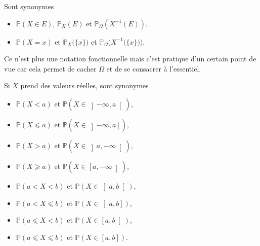 %
\begin{terminology}
Sont synonymes
\begin{itemize}
\item
\(ℙ(𝑋∈𝐸)\), \(ℙ_{𝑋}(𝐸)\) et \(ℙ_Ω(𝑋^{-1}(𝐸))\).
\item
\(ℙ(𝑋=𝑥)\) et  \(ℙ_{𝑋}\bigl(\{𝑥\}\bigr)\) et \(ℙ_Ω\bigl(𝑋^{-1}\bigl(\{𝑥\}\bigr)\bigr)\).
\end{itemize}
\end{terminology}
%
\begin{remark}
Ce n'est plus une notation fonctionnelle mais c'est pratique d'un certain point de vue car cela permet de cacher \(Ω\) et de se consacrer à l'essentiel.
\end{remark}
\begin{terminology}
Si \(𝑋\) prend des valeurs réelles, sont synonymes
\begin{itemize}
\item
\(ℙ(𝑋<𝑎)\) et \(ℙ(𝑋∈\left]-∞,𝑎\right[)\),
\item
\(ℙ(𝑋⩽𝑎)\) et \(ℙ(𝑋∈\left]-∞,𝑎\right])\),
\item
\(ℙ(𝑋>𝑎)\) et \(ℙ(𝑋∈\left]𝑎,-∞\right[)\),
\item
\(ℙ(𝑋⩾𝑎)\) et \(ℙ(𝑋∈\left[𝑎,-∞\right[)\),
\item
\(ℙ(𝑎<𝑋<𝑏)\) et \(ℙ(𝑋∈\left]𝑎,𝑏\right[)\),
\item
\(ℙ(𝑎<𝑋⩽𝑏)\) et \(ℙ(𝑋∈\left]𝑎,𝑏\right])\),
\item
\(ℙ(𝑎⩽𝑋<𝑏)\) et \(ℙ(𝑋∈\left[𝑎,𝑏\right[)\),
\item
\(ℙ(𝑎⩽𝑋⩽𝑏)\) et \(ℙ(𝑋∈\left[𝑎,𝑏\right])\).
\end{itemize}
\end{terminology}
